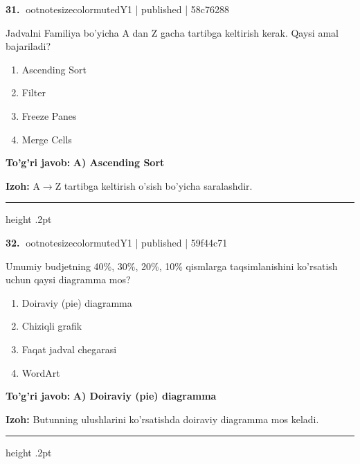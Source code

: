 \documentclass[10pt,a4paper]{article}
\begin{document}
\textbf{\color{ink}31.} {ootnotesizecolor{muted}Y1 | published | 58c76288}
\par
Jadvalni Familiya bo'yicha A dan Z gacha tartibga keltirish kerak. Qaysi amal bajariladi?
\begin{enumerate}[label=\Alph*),leftmargin=9mm]
\item Ascending Sort
\item Filter
\item Freeze Panes
\item Merge Cells
\end{enumerate}
\begin{tcolorbox}[enhanced,breakable,colback=teal!4,colframe=teal!55!black,boxrule=0.45pt,arc=1.2mm,left=2.8mm,right=2.8mm,top=2mm,bottom=2mm]
\textbf{\color{teal}To'g'ri javob:} \textbf{A) Ascending Sort}
\par\smallskip
\textbf{Izoh:} A\ensuremath{\rightarrow}Z tartibga keltirish o'sish bo'yicha saralashdir.
\end{tcolorbox}
\vspace{2mm}\hrule height .2pt\vspace{2mm}

\textbf{\color{ink}32.} {ootnotesizecolor{muted}Y1 | published | 59f44c71}
\par
Umumiy budjetning 40\%, 30\%, 20\%, 10\% qismlarga taqsimlanishini ko'rsatish uchun qaysi diagramma mos?
\begin{enumerate}[label=\Alph*),leftmargin=9mm]
\item Doiraviy (pie) diagramma
\item Chiziqli grafik
\item Faqat jadval chegarasi
\item WordArt
\end{enumerate}
\begin{tcolorbox}[enhanced,breakable,colback=teal!4,colframe=teal!55!black,boxrule=0.45pt,arc=1.2mm,left=2.8mm,right=2.8mm,top=2mm,bottom=2mm]
\textbf{\color{teal}To'g'ri javob:} \textbf{A) Doiraviy (pie) diagramma}
\par\smallskip
\textbf{Izoh:} Butunning ulushlarini ko'rsatishda doiraviy diagramma mos keladi.
\end{tcolorbox}
\vspace{2mm}\hrule height .2pt\vspace{2mm}
\end{document}
